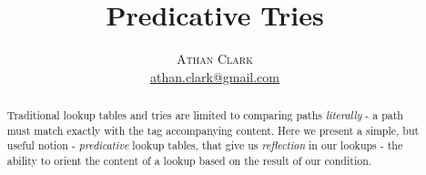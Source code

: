 \documentclass[twoside]{article}
\title{\vspace{-10mm}\fontsize{16pt}{10pt}\selectfont\textbf{Predicative Tries}} %
\author{
\large
\textsc{Athan Clark} \\ %
\normalsize \href{mailto:athan.clark@gmail.com}{athan.clark@gmail.com} %
\vspace{-5mm}
}
\date{}
\begin{document}
\maketitle %


\begin{abstract}

Traditional lookup tables and tries are limited to comparing paths \textit{literally} -
a path must match exactly with the tag accompanying content.
Here we present a simple, but useful notion - \textit{predicative} lookup tables,
that give us \textit{reflection} in our lookups - the ability to orient
the content of a lookup based on the result of our condition.

\end{abstract}

\end{document}
